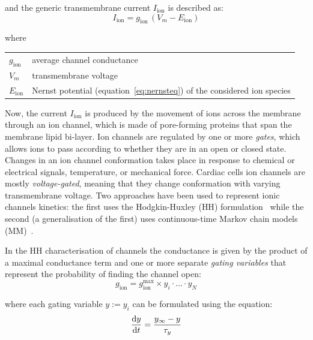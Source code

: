 \vspace{0.5cm}
\noindent
and the generic transmembrane current $I_{\textrm{ion}}$ is described as:
%
\begin{equation}
    I_{\textrm{ion}} = g_{\textrm{ion}}\,(V_m-E_{\textrm{ion}})
\end{equation}

\noindent
where

\vspace{0.2cm}
\begin{tabular}{ll}
    $g_{\textrm{ion}}$ & average channel conductance \\
    $V_m$ & transmembrane voltage \\
    $E_\textrm{ion}$ & Nernst potential (equation~\eqref{eq:nernsteq}) of the considered ion species
\end{tabular}

\vspace{0.5cm}
Now, the current $I_{\textrm{ion}}$ is produced by the movement of ions across the membrane through an ion channel, which is made of pore-forming proteins that span the membrane lipid bi-layer. Ion channels are regulated by one or more \textit{gates}, which allows ions to pass according to whether they are in an open or closed state. Changes in an ion channel conformation takes place in response to chemical or electrical signals, temperature, or mechanical force. Cardiac cells ion channels are mostly \textit{voltage-gated}, meaning that they change conformation with varying transmembrane voltage. Two approaches have been used to represent ionic channels kinetics: the first uses the Hodgkin-Huxley (\acs{HH}) formulation~\cite{Hodgkin:1952} while the second (a generalisation of the first) uses continuous-time Markov chain models (\acs{MM})~\cite{Fink:2009}.

\vspace{0.2cm}
In the HH characterisation of channels the conductance is given by the product of a maximal conductance term and one or more separate \textit{gating variables} that represent the probability of finding the channel open:
%
\begin{equation}
    g_{\textrm{ion}} = g_{\textrm{ion}}^{\textrm{max}}\times y_i\cdot\dots\cdot y_N
\end{equation}

\noindent
where each gating variable $y:=y_i$ can be formulated using the equation:
%
\begin{equation}
    \dfrac{\mathrm{d}{y}}{\mathrm{d}{t}} = \frac{y_{\infty}-y}{\tau_y}
\end{equation}

